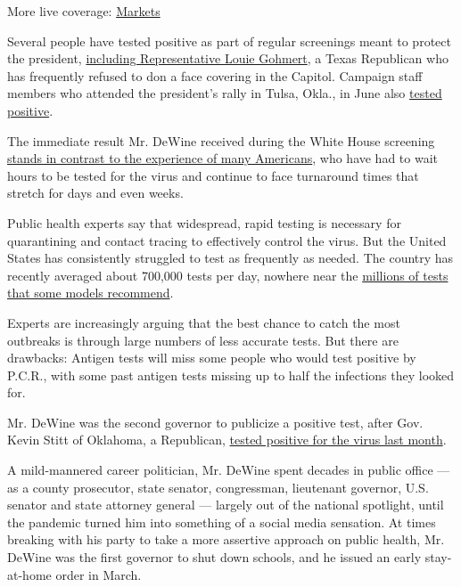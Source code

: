 More live coverage:
\href{https://www.nytimes3xbfgragh.onion/live/2020/09/11/business/stock-market-today-coronavirus?action=click\&pgtype=Article\&state=default\&region=MAIN_CONTENT_1\&context=storylines_live_updates}{Markets}

Several people have tested positive as part of regular screenings meant
to protect the president,
\href{https://www.nytimes3xbfgragh.onion/2020/07/29/us/politics/louie-gohmert-positive-coronavirus-mask.html}{including
Representative Louie Gohmert}, a Texas Republican who has frequently
refused to don a face covering in the Capitol. Campaign staff members
who attended the president's rally in Tulsa, Okla., in June also
\href{https://www.nytimes3xbfgragh.onion/2020/06/22/us/politics/trump-campaign-coronavirus-tulsa.html}{tested
positive}.

The immediate result Mr. DeWine received during the White House
screening
\href{https://www.nytimes3xbfgragh.onion/2020/08/04/us/virus-testing-delays.html}{stands
in contrast to the experience of many Americans}, who have had to wait
hours to be tested for the virus and continue to face turnaround times
that stretch for days and even weeks.

Public health experts say that widespread, rapid testing is necessary
for quarantining and contact tracing to effectively control the virus.
But the United States has consistently struggled to test as frequently
as needed. The country has recently averaged about 700,000 tests per
day, nowhere near the
\href{https://drive.google.com/file/d/1EhUfmT6ayG3ERxX-wZUmB2wtIEOhRAmP/view}{millions
of tests that some models recommend}.

Experts are increasingly arguing that the best chance to catch the most
outbreaks is through large numbers of less accurate tests. But there are
drawbacks: Antigen tests will miss some people who would test positive
by P.C.R., with some past antigen tests missing up to half the
infections they looked for.

Mr. DeWine was the second governor to publicize a positive test, after
Gov. Kevin Stitt of Oklahoma, a Republican,
\href{https://www.nytimes3xbfgragh.onion/2020/07/15/us/oklahoma-governor-coronavirus-stitt.html}{tested
positive for the virus last month}.

A mild-mannered career politician, Mr. DeWine spent decades in public
office --- as a county prosecutor, state senator, congressman,
lieutenant governor, U.S. senator and state attorney general --- largely
out of the national spotlight, until the pandemic turned him into
something of a social media sensation. At times breaking with his party
to take a more assertive approach on public health, Mr. DeWine was the
first governor to shut down schools, and he issued an early stay-at-home
order in March.

